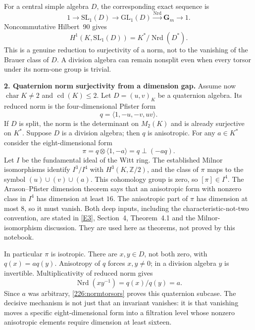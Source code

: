 \documentclass[11pt,a4paper]{article}
\newcommand{\Z}{\mathbb{Z}}
\newcommand{\eref}[2]{\hyperlink{extra:#1:#2}{[E#2]}}
\numberwithin{equation}{section}
\begin{document}
For a central simple algebra $D$, the corresponding exact sequence is
\[
 1\longrightarrow\mathrm{SL}_1(D)\longrightarrow\mathrm{GL}_1(D)
     \xrightarrow{\operatorname{Nrd}}\mathbf G_m\longrightarrow1.
\]
Noncommutative Hilbert~90 gives
\begin{equation}\label{226:normtorsors}
 H^1(K,\mathrm{SL}_1(D))=K^*/\operatorname{Nrd}(D^*).
\end{equation}
This is a genuine reduction to surjectivity of a norm, not to the
vanishing of the Brauer class of $D$. A division algebra can remain
nonsplit even when every torsor under its norm-one group is trivial.

\textbf{2. Quaternion norm surjectivity from a dimension gap.}
Assume now $\operatorname{char}K\ne2$ and $\operatorname{cd}(K)\le2$.
Let $D=(u,v)_K$ be a quaternion algebra. Its reduced norm is the
four-dimensional Pfister form
\[
 q=\langle1,-u,-v,uv\rangle.
\]
If $D$ is split, the norm is the determinant on $M_2(K)$ and is already
surjective on $K^*$. Suppose $D$ is a division algebra; then $q$ is
anisotropic. For any $a\in K^*$ consider the eight-dimensional form
\[
 \pi=q\otimes\langle1,-a\rangle=q\perp(-a q).
\]
Let $I$ be the fundamental ideal of the Witt ring. The established
Milnor isomorphisms identify $I^3/I^4$ with
$H^3(K,\Z/2)$, and the class of $\pi$ maps to the symbol
$(u)\cup(v)\cup(a)$. This cohomology group is zero, so $[\pi]\in I^4$.
The Arason--Pfister dimension theorem says that an anisotropic form
with nonzero class in $I^4$ has dimension at least $16$.
The anisotropic part of $\pi$ has dimension at most $8$, so it must
vanish. Both deep inputs, including the characteristic-not-two
convention, are stated in \eref{226}{3}, Section~4, Theorem~4.1 and the
Milnor-isomorphism discussion. They are used here as theorems, not
proved by this notebook.

In particular $\pi$ is isotropic. There are $x,y\in D$, not both zero,
with $q(x)=a q(y)$. Anisotropy of $q$ forces $x,y\ne0$; in a division
algebra $y$ is invertible. Multiplicativity of reduced norm gives
\begin{equation}\label{226:ratio}
 \operatorname{Nrd}(xy^{-1})=q(x)/q(y)=a.
\end{equation}
Since $a$ was arbitrary, \eqref{226:normtorsors} proves this quaternion
subcase. The decisive mechanism is not just that an invariant vanishes:
it is that vanishing moves a specific eight-dimensional form into a
filtration level whose nonzero anisotropic elements require dimension
at least sixteen.
\end{document}
